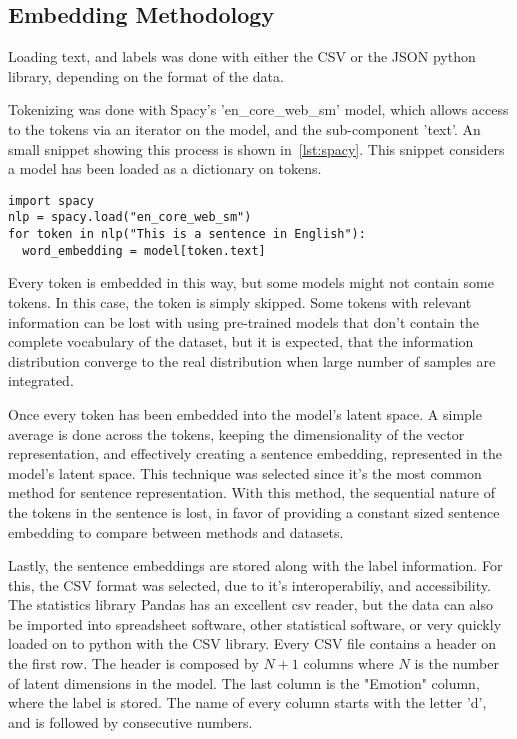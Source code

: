 \subsection{Embedding Methodology}\label{sub:Embedding Methodology}

Loading text, and labels was done with either the CSV or the JSON python library, depending on the format of the data.

Tokenizing was done with Spacy's 'en_core_web_sm' model, which allows access to the tokens via an iterator on the model, and the sub-component 'text'. An small snippet showing this process is shown in~\ref{lst:spacy}. This snippet considers a model has been loaded as a dictionary on tokens.

\begin{lstlisting}[caption={Tokenizing with Spacy},label=lst:spacy,frame=single]
import spacy
nlp = spacy.load("en_core_web_sm")
for token in nlp("This is a sentence in English"):
  word_embedding = model[token.text]
\end{lstlisting}

Every token is embedded in this way, but some models might not contain some tokens. In this case, the token is simply skipped. Some tokens with relevant information can be lost with using pre-trained models that don't contain the complete vocabulary of the dataset, but it is expected, that the information distribution converge to the real distribution when large number of samples are integrated.

Once every token has been embedded into the model's latent space. A simple average is done across the tokens, keeping the dimensionality of the vector representation, and effectively creating a sentence embedding, represented in the model's latent space. This technique was selected since it's the most common method for sentence representation. With this method, the sequential nature of the tokens in the sentence is lost, in favor of providing a constant sized sentence embedding to compare between methods and datasets.

Lastly, the sentence embeddings are stored along with the label information. For this, the CSV format was selected, due to it's interoperabiliy, and accessibility. The statistics library Pandas has an excellent csv reader, but the data can also be imported into spreadsheet software, other statistical software, or very quickly loaded on to python with the CSV library. Every CSV file contains a header on the first row. The header is composed by $N+1$ columns where $N$ is the number of latent dimensions in the model. The last column is the "Emotion" column, where the label is stored. The name of every column starts with the letter 'd', and is followed by consecutive numbers.

